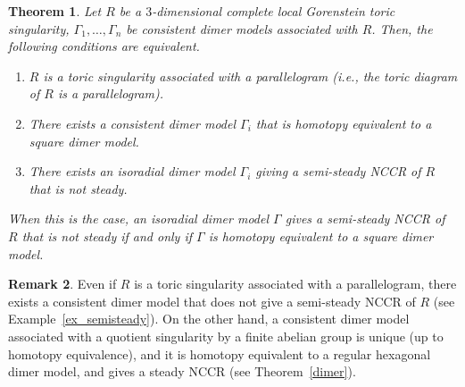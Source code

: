 \documentclass[11pt]{amsart}
\newtheorem{theo}{Theorem}[section]
\theoremstyle{definition}
\newtheorem{rema}[theo]{Remark}
\begin{document}
\begin{theo}\label{main_thm}
Let $R$ be a $3$-dimensional complete local Gorenstein toric singularity, $\Gamma_1,\dots,\Gamma_n$ be consistent dimer models associated with $R$. Then, the following conditions are equivalent.
\begin{enumerate}%
\item\label{th4-2_1} $R$ is a toric singularity associated with a parallelogram (i.e., the toric diagram of $R$ is a parallelogram).
\item\label{th4-2_2} There exists a consistent dimer model $\Gamma_i$ that is homotopy equivalent to a square dimer model.
\item\label{th4-2_3} There exists an isoradial dimer model $\Gamma_i$ giving a semi-steady NCCR of $R$ that is not steady.
\end{enumerate}
When this is the case, an isoradial dimer model $\Gamma$ gives a semi-steady NCCR of $R$ that is not steady if and only if $\Gamma$ is homotopy equivalent to a square dimer model.
\end{theo}

\begin{rema}
Even if $R$ is a toric singularity associated with a parallelogram, there exists a consistent dimer model that does not give a semi-steady NCCR of $R$ (see Example~\ref{ex_semisteady}). On the other hand, a consistent dimer model associated with a quotient singularity by a finite abelian group is unique (up to homotopy equivalence), and it is homotopy equivalent to a regular hexagonal dimer model, and gives a steady NCCR (see Theorem~\ref{dimer}).
\end{rema}
\end{document}
